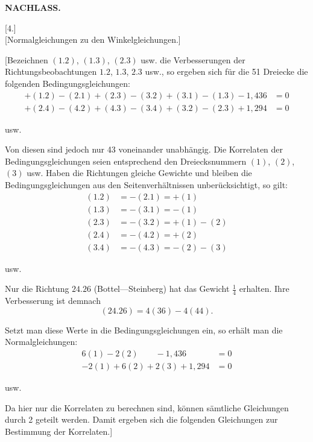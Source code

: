 \hfill\textbf{NACHLASS.}
\begin{center}[4.]\\[4pt]
[Normalgleichungen zu den Winkelgleichungen.]\end{center}

[Bezeichnen $(1.2)$, $(1.3)$, $(2.3)$ usw. die Verbesserungen der Richtungsbeobachtungen
$1.2$, $1.3$, $2.3$ usw., so ergeben sich für die 51 Dreiecke
die folgenden Bedingungsgleichungen:
\[
\begin{aligned}
+(1.2)-(2.1)+(2.3)-(3.2)+(3.1)-(1.3)-1{,}436&=0\\
+(2.4)-(4.2)+(4.3)-(3.4)+(3.2)-(2.3)+1{,}294&=0
\end{aligned}
\]
\begin{center}usw.\end{center}

Von diesen sind jedoch nur 43 voneinander unabhängig. Die Korrelaten
der Bedingungsgleichungen seien entsprechend den Dreiecksnummern $(1)$, $(2)$,
$(3)$ usw. Haben die Richtungen gleiche Gewichte und bleiben die
Bedingungsgleichungen aus den Seitenverhältnissen unberücksichtigt,
so gilt:
\[
\begin{aligned}
(1.2)&=-(2.1)=+(1)\\
(1.3)&=-(3.1)=-(1)\\
(2.3)&=-(3.2)=+(1)-(2)\\
(2.4)&=-(4.2)=+(2)\\
(3.4)&=-(4.3)=-(2)-(3)
\end{aligned}
\]
\begin{center}usw.\end{center}

Nur die Richtung $24.26$ (Bottel---Steinberg) hat das Gewicht $\frac14$ erhalten.
Ihre Verbesserung ist demnach
\[
(24.26)=4(36)-4(44).
\]

Setzt man diese Werte in die Bedingungsgleichungen ein, so erhält man
die Normalgleichungen:
\[
\begin{aligned}
6(1)-2(2)\qquad-1{,}436&=0\\
-2(1)+6(2)+2(3)+1{,}294&=0
\end{aligned}
\]
\begin{center}usw.\end{center}

Da hier nur die Korrelaten zu berechnen sind, können sämtliche
Gleichungen durch 2 geteilt werden. Damit ergeben sich die folgenden
Gleichungen zur Bestimmung der Korrelaten.]

